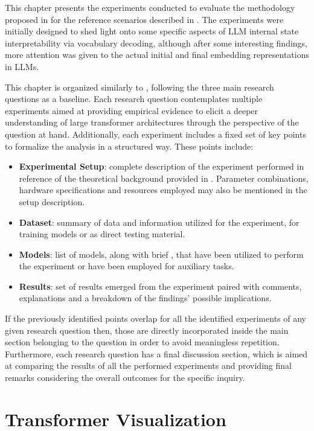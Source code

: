 This chapter presents the experiments conducted to evaluate the methodology proposed in  for the reference scenarios described in .
The experiments were initially designed to shed light onto some specific aspects of LLM internal state interpretability via vocabulary decoding, although after some interesting findings, more attention was given to the actual initial and final embedding representations in LLMs.

This chapter is organized similarly to , following the three main research questions as a baseline.
Each research question contemplates multiple experiments aimed at providing empirical evidence to elicit a deeper understanding of large transformer architectures through the perspective of the question at hand.
Additionally, each experiment includes a fixed set of key points to formalize the analysis in a structured way.
These points include:
\begin{itemize}
    \item \textbf{Experimental Setup}: complete description of the experiment performed in reference of the theoretical background provided in .
Parameter combinations, hardware specifications and resources employed may also be mentioned in the setup description.
    \item \textbf{Dataset}: summary of data and information utilized for the experiment,  for training models or as direct testing material.
    \item \textbf{Models}: list of models, along with brief , that have been utilized to perform the experiment or have been employed for auxiliary tasks. 
    \item \textbf{Results}: set of results emerged from the experiment paired with comments, explanations and a breakdown of the findings' possible implications.
\end{itemize}
If the previously identified points overlap for all the identified experiments of any given research question then, those are directly incorporated inside the main section belonging to the question in order to avoid meaningless repetition.
Furthermore, each research question has a final discussion section, which is aimed at comparing the results of all the performed experiments and providing final remarks considering the overall outcomes for the specific inquiry.

\section{Transformer Visualization}

